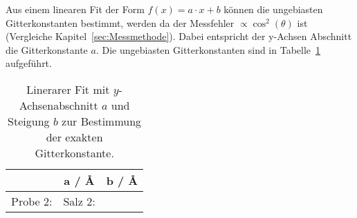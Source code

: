 Aus einem linearen Fit der Form $f(x) = a \cdot x + b$ können die ungebiasten
Gitterkonstanten bestimmt, werden da der Messfehler $\propto \cos^2(\theta)$ ist
(Vergleiche Kapitel~\ref{sec:Messmethode}).
Dabei entspricht der y-Achsen Abschnitt die Gitterkonstante $a$.
Die ungebiasten Gitterkonstanten sind in Tabelle~\ref{tab:gitt} aufgeführt.

\begin{table}[ht]
		\centering
		\caption{Linerarer Fit mit $y$-Achsenabschnitt $a$ und Steigung $b$ zur
				Bestimmung der exakten Gitterkonstante.}
		\label{tab:gitt}
		\begin{tabular}{l c c}
				\toprule
        & a / \AA & b / \AA \\
				\midrule
				Probe 2: 	& 
				Salz 2: 	& 
				\bottomrule
		\end{tabular}
\end{table}
